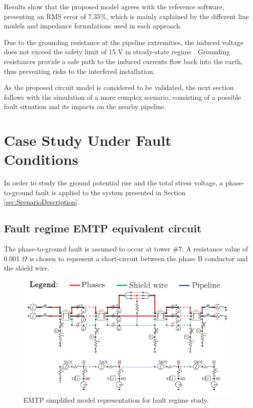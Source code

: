 \documentclass{IEEEtran4PSCC}
\begin{document}
Results show that the proposed model agrees with the reference software, presenting an RMS error of 7.35\%, which is
mainly explained by the different line models and impedance formulations used in each approach.

Due to the grounding resistance at the pipeline extremities, the induced voltage does not exceed the safety limit of 15 V in steady-state regime \cite{NACEInternational2007}. Grounding resistances provide a safe path to the induced currents flow back into the earth, thus preventing risks to the interfered installation. 

As the proposed circuit model is considered to be validated, the next section follows with the simulation of a more complex scenario, consisting of a possible fault situation and its impacts on the nearby pipeline.

\section{Case Study Under Fault Conditions}

In order to study the ground potential rise and the total stress voltage, a phase-to-ground fault is applied to the system presented in Section \ref{sec:ScenarioDescription}.

\subsection{Fault regime EMTP equivalent circuit}

The phase-to-ground fault is assumed to occur at tower \#7. A resistance value of 0.001 $\Omega$  is chosen to represent a short-circuit between the phase B conductor and the shield wire.

\begin{figure}[hbt]
	\begin{center}
		\includegraphics[width=1\columnwidth]{./fig/Fault_circuit2.pdf}
		\caption{EMTP simplified model representation for fault regime study.}
		\label{fig:FaultCircuit}
	\end{center}
\end{figure}
\end{document}
